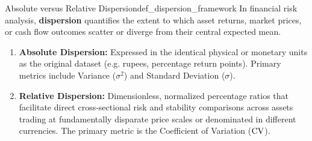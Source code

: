 \begin{definition}{Absolute versus Relative Dispersion}{def_dispersion_framework}
In financial risk analysis, \textbf{dispersion} quantifies the extent to which asset returns, market prices, or cash flow outcomes scatter or diverge from their central expected mean.
\begin{enumerate}[leftmargin=*, topsep=2pt, itemsep=3pt]
    \item \textbf{Absolute Dispersion:} Expressed in the identical physical or monetary units as the original dataset (e.g. rupees, percentage return points). Primary metrics include Variance ($\sigma^2$) and Standard Deviation ($\sigma$).
    \item \textbf{Relative Dispersion:} Dimensionless, normalized percentage ratios that facilitate direct cross-sectional risk and stability comparisons across assets trading at fundamentally disparate price scales or denominated in different currencies. The primary metric is the Coefficient of Variation ($\operatorname{CV}$).
\end{enumerate}
\end{definition}

